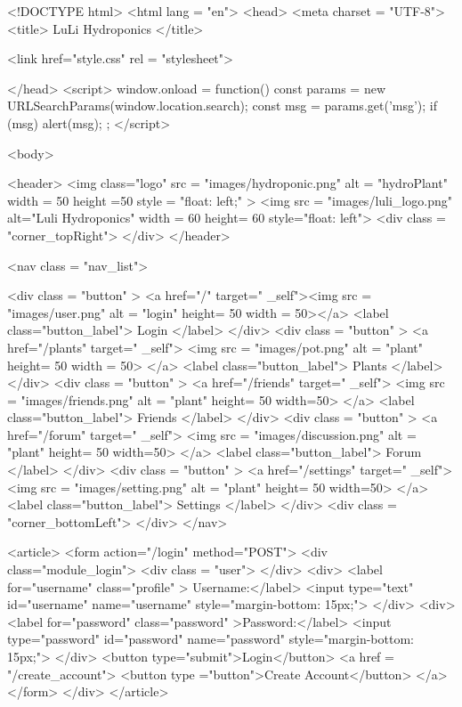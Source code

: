 \documentclass[12pt]{article} %
\begin{document}
    \begin{htmlcode}[caption={Login Page HTML}]
    
    <!DOCTYPE html>
    <html lang = "en">
    <head>
    <meta charset = "UTF-8">
    <title> LuLi Hydroponics </title>
    
    <link href="style.css" 
          rel = "stylesheet">
    
    
    </head>
    <script>
       window.onload = function() {
           const params = new URLSearchParams(window.location.search);
           const msg = params.get('msg');
           if (msg) {
               alert(msg);
           }
       };
    </script>
    
    <body>
     
       <header>
          <img class="logo" src = "images/hydroponic.png" alt = "hydroPlant"  width = 50 height =50 style = "float: left;" >   
          <img src = "images/luli_logo.png" alt="Luli Hydroponics" width = 60 height= 60 style="float: left">
          <div class = "corner_topRight"> </div>
       </header>
    
         <nav class = "nav_list">
          
          <div class = "button" > 
             <a href="/" target=" _self"><img src = "images/user.png" alt = "login" height= 50 width = 50></a>
             <label class="button_label"> Login </label> 
          </div>
          <div class = "button" > 
             <a href="/plants" target=" _self"> <img src = "images/pot.png" alt = "plant" height= 50 width = 50> </a>
             <label class="button_label"> Plants </label> 
          </div>
          <div class = "button" > 
             <a href="/friends" target=" _self"> <img src = "images/friends.png" alt = "plant" height= 50 width=50> </a>
             <label class="button_label"> Friends </label> 
          </div>
          <div class = "button" > 
             <a href="/forum" target=" _self"> <img src = "images/discussion.png" alt = "plant" height= 50 width=50> </a>
             <label class="button_label"> Forum </label> 
          </div>
          <div class = "button" > 
             <a href="/settings" target=" _self"> <img src = "images/setting.png" alt = "plant" height= 50 width=50> </a>
             <label class="button_label"> Settings </label> 
          </div>
             <div class = "corner_bottomLeft"> </div>
         </nav>
         
         <article>
          <form action="/login" method="POST">
          <div class="module_login">
                <div class = "user">
                </div>
                <div>
                <label for="username" class="profile" > Username:</label>
                <input type="text" id="username" name="username" style="margin-bottom: 15px;">
                </div>
                <div>
                <label for="password" class="password" >Password:</label>
                <input type="password" id="password" name="password" style="margin-bottom: 15px;">
                </div>
                <button type="submit">Login</button>
                <a href = "/create_account"> <button type ="button">Create Account</button> </a>
             </form>
          </div>
       </article> 
       

\end{htmlcode}
\end{document}
